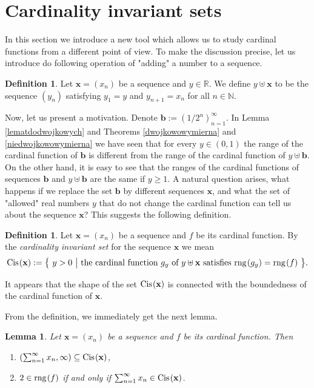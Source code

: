 \documentclass{amsart}
\newtheorem{lemma}[theorem]{Lemma}
\theoremstyle{definition}
\newtheorem{definition}[theorem]{Definition}
\newcommand{\rng}{{\rm rng} \hspace{0.03cm}}
\newcommand{\Cis}{{\rm Cis} \hspace{0.03cm}}
\begin{document}
\section{Cardinality invariant sets}

In this section we introduce a new tool which allows us to study cardinal functions from a different point of view. To make the discussion precise, let us introduce do following operation of "adding" a number to a sequence.
\begin{definition}
Let $\textbf{x}=(x_n)$ be a sequence and $y\in\mathbb{R}$. We define $y\uplus \textbf{x}$ to be the sequence $(y_n)$ satisfying $y_1=y$ and $y_{n+1}=x_n$ for all $n\in\mathbb{N}$.
\end{definition}


Now, let us present a motivation. Denote $\textbf{b}:=(1/2^{n})_{n=1}^{\infty}$. In Lemma \ref{lematdodwojkowych} and Theorems \ref{dwojkowowymierna} and \ref{niedwojkowowymierna} we have seen that for every $y\in (0,1)$ the range of the cardinal function of $\mathbf{b}$ is different from the range of the cardinal function of $y\uplus\mathbf{b}$. On the other hand, it is easy to see that the ranges of the cardinal functions of sequences $\mathbf{b}$ and $y\uplus\mathbf{b}$ are the same if $y\geq 1$. A natural question arises, what happens if we replace the set $\mathbf{b}$ by different sequences $\mathbf{x}$, and  what the set of "allowed" real numbers $y$ that do not change the cardinal function can tell us about the sequence $\mathbf{x}$? This suggests the following definition.
\begin{definition}
Let $\textbf{x}=(x_n)$ be a sequence and $f$ be its cardinal function. By the {\it cardinality invariant set} for the sequence $\textbf{x}$ we mean
\begin{align*}
\Cis (\textbf{x}) := \big\{\ y>0\ \big| \textrm{ the cardinal function } g_{y} \textrm{ of } y\uplus \textbf{x} \textrm{ satisfies } \rng(g_{y})=\rng(f)\ \big\}.
\end{align*}
\end{definition}
It appears that the shape of the set $\Cis (\textbf{x})$ is connected with the boundedness of the cardinal function of $\mathbf{x}$.


From the definition, we immediately get the next lemma.

\begin{lemma}\label{trywialnefixy}
Let $\mathbf{x}=(x_n)$ be a %
sequence and $f$ be its cardinal function. Then 
\begin{enumerate}
\item $\left(\sum_{n=1}^{\infty}x_n,\infty\right)\subseteq \Cis (\mathbf{x})$,
\item $2\in\rng (f)$ if and only if $\sum_{n=1}^{\infty}x_n\in \Cis (\mathbf{x})$.
\end{enumerate}
\end{lemma}
\end{document}
